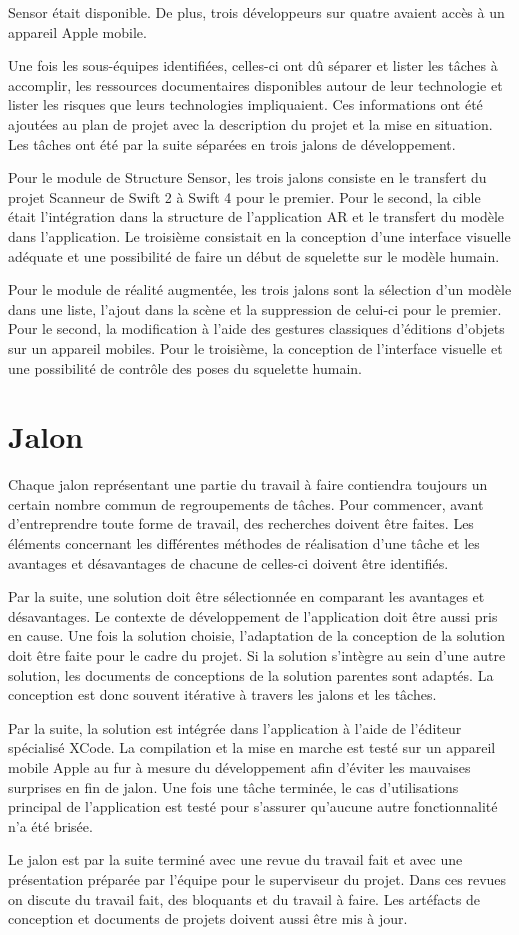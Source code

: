 \documentclass[letterpaper,twoside,12pt,french]{report}
\begin{document}
Sensor était disponible. De plus, trois développeurs sur quatre avaient accès à un appareil Apple
mobile.
\par
Une fois les sous-équipes identifiées, celles-ci ont dû séparer et lister les tâches à
accomplir, les ressources documentaires disponibles autour de leur technologie et lister les
risques que leurs technologies impliquaient. Ces informations ont été ajoutées au plan de projet avec
la description du projet et la mise en situation. Les tâches ont été par la suite séparées en trois
jalons de développement.
\par
Pour le module de Structure Sensor, les trois jalons consiste en le transfert du projet Scanneur de
Swift 2 à Swift 4 pour le premier. Pour le second, la cible était l'intégration dans la structure 
de l'application AR et le transfert du modèle dans l'application. Le troisième consistait en la 
conception d'une interface visuelle adéquate et une possibilité de faire un début de squelette sur
le modèle humain.
\par
Pour le module de réalité augmentée, les trois jalons sont la sélection d'un modèle dans une liste,
l'ajout dans la scène et la suppression de celui-ci pour le premier. Pour le second, la modification
à l'aide des gestures classiques d'éditions d'objets sur un appareil mobiles. Pour le troisième, la
conception de l'interface visuelle et une possibilité de contrôle des poses du squelette humain.
\section*{Jalon}
Chaque jalon représentant une partie du travail à faire contiendra toujours un certain nombre 
commun de regroupements de tâches. Pour commencer, avant d'entreprendre toute forme de travail, des
recherches doivent être faites. Les éléments concernant les différentes méthodes de réalisation d'une
tâche et les avantages et désavantages de chacune de celles-ci doivent être identifiés.
\par
Par la suite, une solution doit être sélectionnée en comparant les avantages et désavantages.
Le contexte de développement de l'application doit être aussi pris en cause. Une fois la solution
choisie, l'adaptation de la conception de la solution doit être faite pour le cadre du projet. Si
la solution s'intègre au sein d'une autre solution, les documents de conceptions de la solution
parentes sont adaptés. La conception est donc souvent itérative à travers les jalons et les
tâches.
\par
Par la suite, la solution est intégrée dans l'application à l'aide de l'éditeur spécialisé XCode.
La compilation et la mise en marche est testé sur un appareil mobile Apple au fur à mesure du
développement afin d'éviter les mauvaises surprises en fin de jalon. Une fois une tâche terminée,
le cas d'utilisations principal de l'application est testé pour s'assurer qu'aucune autre
fonctionnalité n'a été brisée.
\par
Le jalon est par la suite terminé avec une revue du travail fait et avec une présentation préparée par
l'équipe pour le superviseur du projet. Dans ces revues on discute du travail fait, des bloquants
et du travail à faire. Les artéfacts de conception et documents de projets doivent aussi être mis à
jour.
\end{document}
